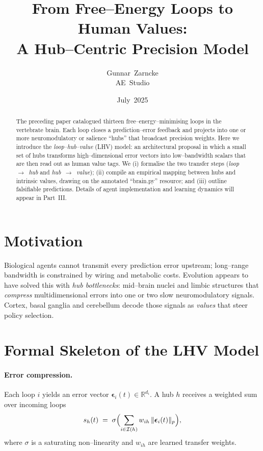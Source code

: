 \documentclass[11pt]{article}
\title{From Free--Energy Loops to Human Values:\\A Hub--Centric Precision Model}
\author{Gunnar~Zarncke\\AE~Studio}
\date{July~2025}
\begin{document}
\maketitle

\begin{abstract}
The preceding paper catalogued thirteen free--energy--minimising loops in the vertebrate brain.  Each loop closes a prediction--error feedback and projects into one or more neuromodulatory or salience ``hubs'' that broadcast precision weights.  Here we introduce the \emph{loop--hub--value} (LHV) model: an architectural proposal in which a small set of hubs transforms high--dimensional error vectors into low--bandwidth scalars that are then read out as human value tags.
We (i) formalise the two transfer steps (\emph{loop~$\rightarrow$~hub} and \emph{hub~$\rightarrow$~value}); (ii) compile an empirical mapping between hubs and intrinsic values, drawing on the annotated ``brain.py'' resource; and (iii) outline falsifiable predictions.
Details of agent implementation and learning dynamics will appear in Part~III.
\end{abstract}

\section{Motivation}
Biological agents cannot transmit every prediction error upstream; long--range bandwidth is constrained by wiring and metabolic costs.  Evolution appears to have solved this with \emph{hub bottlenecks}: mid--brain nuclei and limbic structures that \emph{compress} multidimensional errors into one or two slow neuromodulatory signals.  Cortex, basal ganglia and cerebellum decode those signals as \emph{values} that steer policy selection.

\section{Formal Skeleton of the LHV Model}
\paragraph{Error compression.}  Each loop $i$ yields an error vector $\boldsymbol{\epsilon}_i(t) \in \mathbb{R}^{d_i}$.  A hub $h$ receives a weighted sum over incoming loops
\begin{equation}
    s_h(t)\;=\;\sigma\Bigl(\sum_{i \in \mathcal{I}(h)} w_{ih}\,\lVert\boldsymbol{\epsilon}_i(t)\rVert_{p}\Bigr),
\end{equation}
where $\sigma$ is a saturating non--linearity and $w_{ih}$ are learned transfer weights.
\end{document}
